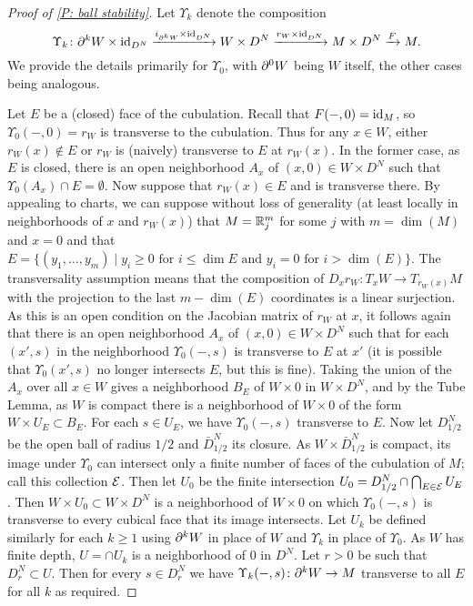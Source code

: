 \begin{proof}[Proof of \cref{P: ball stability}]
	Let $\Upsilon_k$ denote the composition $$\Upsilon_k \colon \partial^kW \times \mathrm{id}_{D^N}  \xrightarrow{i_{\partial^ kW} \times \mathrm{id}_{D^N}} W \times D^N \xrightarrow{r_W \times \mathrm{id}_{D^N} } M \times D^N \xrightarrow{F} M.$$
	We provide the details primarily for $\Upsilon_0$, with $\partial^0 W$ being $W$ itself, the other cases being analogous.


	Let $E$ be a (closed) face of the cubulation.
	Recall that $F(-,0) = \mathrm{id}_M$, so $\Upsilon_0(-,0) = r_W$ is transverse to the cubulation.
	Thus for any $x \in W$, either $r_W(x)\notin E$ or $r_W$ is (naively) transverse to $E$ at $r_W(x)$.
	In the former case, as $E$ is closed, there is an open neighborhood $A_x$ of $(x,0) \in W \times D^N$ such that $\Upsilon_0(A_x) \cap E = \emptyset$.
	Now suppose that $r_W(x) \in E$ and is transverse there.
	By appealing to charts, we can suppose without loss of generality (at least locally in neighborhoods of $x$ and $r_W(x)$) that $M = \mathbb{R}_j^m$ for some $j$ with $m = \dim(M)$ and $x = 0$ and that $E = \{(y_1,\ldots,y_m) \mid y_i\geq 0\text{ for } i \leq \dim E\text{ and } y_i = 0 \text{ for } i>\dim(E)\}$.
	The transversality assumption means that the composition of $D_xr_W \colon T_xW \to T_{r_W(x)}M$ with the projection to the last $m-\dim(E)$ coordinates is a linear surjection.
	As this is an open condition on the Jacobian matrix of $r_W$ at $x$, it follows again that there is an open neighborhood $A_x$ of $(x,0) \in W \times D^N$ such that for each $(x',s)$ in the neighborhood $\Upsilon_0(-,s)$ is transverse to $E$ at $x'$ (it is possible that $\Upsilon_0(x',s)$ no longer intersects $E$, but this is fine).
	Taking the union of the $A_x$ over all $x \in W$ gives a neighborhood $B_E$ of $W \times 0$ in $W \times D^N$, and by the Tube Lemma, as $W$ is compact there is a neighborhood of $W \times 0$ of the form $W \times U_E \subset B_E$.
	For each $s \in U_E$, we have $\Upsilon_0(-,s)$ transverse to $E$.
	Now let $D^N_{1/2}$ be the open ball of radius $1/2$ and $\bar D^N_{1/2}$ its closure.
	As $W \times \bar D^N_{1/2}$ is compact, its image under $\Upsilon_0$ can intersect only a finite number of faces of the cubulation of $M$; call this collection $\mathcal{E}$.
	Then let $U_0$ be the finite intersection $U_0 = D^N_{1/2} \cap \bigcap_{E\in\mathcal{E}} U_E$.
	Then $W \times U_0 \subset W \times D^N$ is a neighborhood of $W \times 0$ on which $\Upsilon_0(-,s)$ is transverse to every cubical face that its image intersects.
	Let $U_k$ be defined similarly for each $k\geq 1$ using $\partial^kW$ in place of $W$ and $\Upsilon_k$ in place of $\Upsilon_0$.
	As $W$ has finite depth, $U = \cap U_k$ is a neighborhood of $0$ in $D^N$.
	Let $r>0$ be such that $D^N_r \subset U$.
	Then for every $s \in D^N_r$ we have $\Upsilon_k(-,s) \colon \partial^kW \to M$ transverse to all $E$ for all $k$ as required.


\end{proof}
